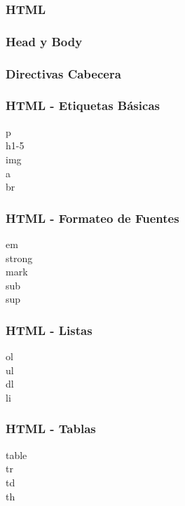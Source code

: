 \documentclass[a4paper,slidestop,xcolor=pst,blue]{beamer}
\begin{document}
\begin{frame}[c]
    \frametitle{HTML}
\end{frame}

\begin{frame}[c]
    \frametitle{Head y Body}
\end{frame}

\begin{frame}[c]
    \frametitle{Directivas Cabecera}
\end{frame}


\begin{frame}[c]
    \frametitle{HTML - Etiquetas Básicas}
    \begin{description}
        \item[p]
        \item[h1-5]
        \item[img]
        \item[a]
        \item[br]
    \end{description}
\end{frame}

\begin{frame}[c]
    \frametitle{HTML - Formateo de Fuentes}
    \begin{description}
        \item[em]
        \item[strong]
        \item[mark]
        \item[sub]
        \item[sup]
    \end{description}
\end{frame}

\begin{frame}[c]
    \frametitle{HTML - Listas}
    \begin{description}
        \item[ol]
        \item[ul]
        \item[dl]
        \item[li]
    \end{description}
\end{frame}

\begin{frame}[c]
    \frametitle{HTML - Tablas}
    \begin{description}
        \item[table]
        \item[tr]
        \item[td]
        \item[th]
    \end{description}
\end{frame}
\end{document}
